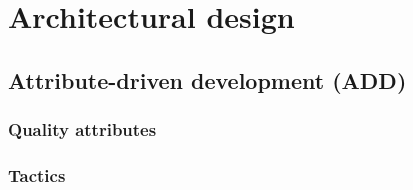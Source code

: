\chapter{Architectural design}\label{chapter:architectural-design}

\section{Attribute-driven development (ADD)}

\subsection{Quality attributes}


\subsection{Tactics}





